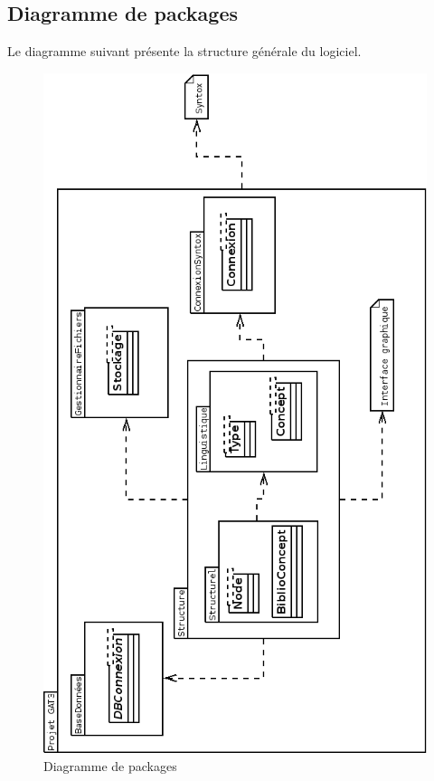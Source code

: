 \documentclass[12pt]{report}
\begin{document}
\subsection{Diagramme de packages}
Le diagramme suivant présente la structure générale du logiciel.

\begin{figure}[h!]
\begin{center}
\includegraphics[scale=0.40]{DiagPackages.png}
\caption{Diagramme de packages}
\end{center}
\end{figure}
\end{document}

